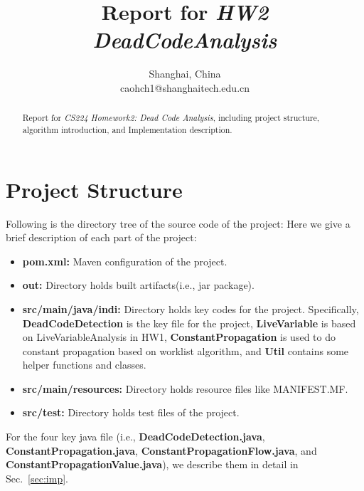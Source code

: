 \documentclass[conference]{IEEEtran}
\begin{document}
\title{Report for \textit{HW2 DeadCodeAnalysis}}


\author{
Shanghai, China\\
caohch1@shanghaitech.edu.cn}


\maketitle
\begin{abstract}
    Report for \textit{CS224 Homework2: Dead Code Analysis}, including project structure, algorithm introduction, and Implementation description.
\end{abstract}

\section{Project Structure}
Following is the directory tree of the source code of the project:
Here we give a brief description of each part of the project:
\begin{itemize}
    \item \textbf{pom.xml: } Maven configuration of the project.
    \item \textbf{out: } Directory holds built artifacts(i.e., jar package).
    \item \textbf{src/main/java/indi: } Directory holds key codes for the project. Specifically, \textbf{DeadCodeDetection} is the key file for the project, \textbf{LiveVariable} is based on LiveVariableAnalysis in HW1, \textbf{ConstantPropagation} is used to do constant propagation based on worklist algorithm, and \textbf{Util} contains some helper functions and classes.
    \item \textbf{src/main/resources: } Directory holds resource files like MANIFEST.MF.
    \item \textbf{src/test: } Directory holds test files of the project.
\end{itemize}

For the four key java file (i.e., \textbf{DeadCodeDetection.java}, \textbf{ConstantPropagation.java}, \textbf{ConstantPropagationFlow.java}, and \textbf{ConstantPropagationValue.java}), we describe them in detail in Sec.~\ref{sec:imp}.
\end{document}
